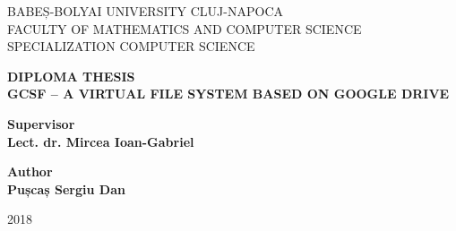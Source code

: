 \begin{titlepage}
\sloppy
\begin{center}
\normalsize{BABEȘ-BOLYAI UNIVERSITY CLUJ-NAPOCA}\\
\normalsize{FACULTY OF MATHEMATICS AND COMPUTER SCIENCE}\\
\normalsize{SPECIALIZATION COMPUTER SCIENCE}\\
\end{center}

\vspace{2cm}
\begin{center}
\huge \textbf{DIPLOMA THESIS}\\
\vspace{1cm}
\Huge \textbf{GCSF -- A VIRTUAL FILE SYSTEM BASED ON GOOGLE DRIVE}
\end{center}

\vspace{2cm}

\begin{flushleft}
\textbf{Supervisor} \\
\textbf{Lect. dr. Mircea Ioan-Gabriel}
\end{flushleft}


\begin{flushright}
\textbf{Author} \\
\textbf{Pușcaș Sergiu Dan}
\end{flushright}

\vspace{1.5 cm}
\begin{center}
\Large{2018}
\end{center}

\end{titlepage}
